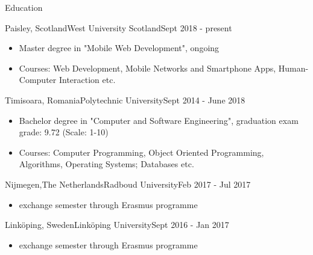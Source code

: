 \documentclass[]{mcdowellcv}
\begin{document}
	\begin{cvsection}{Education}
		\begin{cvsubsection}{Paisley, Scotland}{West University Scotland}{Sept 2018 - present}
			\begin{itemize}
				\item Master degree in "Mobile Web Development", ongoing
				\item Courses: Web Development, Mobile Networks and Smartphone Apps, Human-Computer Interaction etc.
			\end{itemize}
		\end{cvsubsection}

		\begin{cvsubsection}{Timisoara, Romania}{Polytechnic University}{Sept 2014 - June 2018}
			\begin{itemize}
				\item Bachelor degree in "Computer and Software Engineering", graduation exam grade: 9.72 (Scale: 1-10)
				\item Courses: Computer Programming, Object Oriented Programming, Algorithms, Operating Systems; Databases etc.
			\end{itemize}
		\end{cvsubsection}
	
		\begin{cvsubsection}{Nijmegen,The Netherlands}{Radboud University}{Feb 2017 - Jul 2017}
			\begin{itemize}
				\item exchange semester through Erasmus programme 
			\end{itemize}
		\end{cvsubsection}

		\begin{cvsubsection}{Linköping, Sweden}{Linköping University}{Sept 2016 - Jan 2017}
			\begin{itemize}
				\item exchange semester through Erasmus programme 
			\end{itemize}
		\end{cvsubsection}

	\end{cvsection}
	
\end{document}
